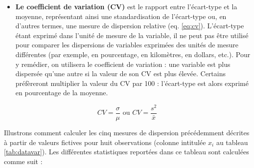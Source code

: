 \documentclass[
  11pt,
  french,
]{book}
\providecommand{\tightlist}{%
  \setlength{\itemsep}{0pt}\setlength{\parskip}{0pt}}
\begin{document}
\begin{itemize}
\tightlist
\item
  \textbf{Le coefficient de variation (CV)} est le rapport entre l'écart-type et la moyenne, représentant ainsi une standardisation de l'écart-type ou, en d'autres termes, une mesure de dispersion relative (eq. \eqref{eq:cv}). L'écart-type étant exprimé dans l'unité de mesure de la variable, il ne peut pas être utilisé pour comparer les dispersions de variables exprimées des unités de mesure différentes (par exemple, en pourcentage, en kilomètres, en dollars, etc.). Pour y remédier, on utilisera le coefficient de variation : une variable est plus dispersée qu'une autre si la valeur de son CV est plus élevée. Certains préfèreront multiplier la valeur du CV par 100 : l'écart-type est alors exprimé en pourcentage de la moyenne.
\end{itemize}

\footnotesize

\begin{equation}  
CV=\frac{\sigma}{\mu} \text{ ou } CV=\frac{s^2}{\bar{x}}
\label{eq:cv}
\end{equation}
\normalsize

Illustrons comment calculer les cinq mesures de dispersion précédemment décrites à partir de valeurs fictives pour huit observations (colonne intitulée \(x_i\) au tableau \ref{tab:datavar}). Les différentes statistiques reportées dans ce tableau sont calculées comme suit :
\end{document}
